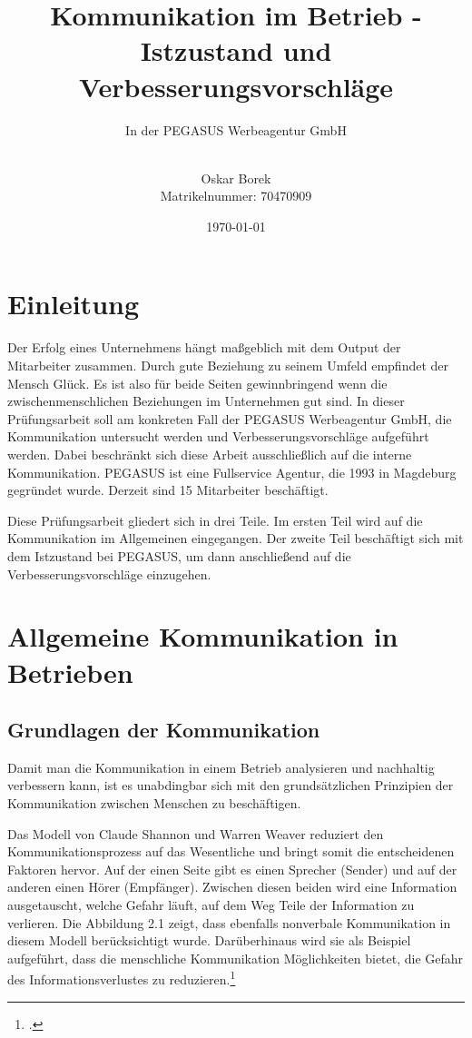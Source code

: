 \documentclass[12pt, DIV9, BCOR9mm, onecolumn, headsepline, ngerman]{scrreprt}
\title{Kommunikation im Betrieb - Istzustand und Verbesserungsvorschläge}
\subtitle{In der PEGASUS Werbeagentur GmbH}
\author{\\[1cm]Oskar Borek \\ Matrikelnummer: 70470909 }
\date{\today}
\begin{document}
 

\maketitle

\newpage
\tableofcontents

\newpage

\pagestyle{headings}


\chapter{Einleitung}

Der Erfolg eines Unternehmens hängt maßgeblich mit dem Output der Mitarbeiter zusammen. Durch gute Beziehung zu seinem Umfeld empfindet der Mensch Glück. Es ist also für beide Seiten gewinnbringend wenn die zwischenmenschlichen Beziehungen im Unternehmen gut sind. In dieser Prüfungsarbeit soll am konkreten Fall der PEGASUS Werbeagentur GmbH, die Kommunikation untersucht werden und Verbesserungsvorschläge aufgeführt werden. Dabei beschränkt sich diese Arbeit ausschließlich auf die interne Kommunikation.
PEGASUS ist eine Fullservice Agentur, die 1993 in Magdeburg gegründet wurde. Derzeit sind 15 Mitarbeiter beschäftigt.

Diese Prüfungsarbeit gliedert sich in drei Teile. Im ersten Teil wird auf die Kommunikation im Allgemeinen eingegangen. Der zweite Teil beschäftigt sich mit dem Istzustand bei PEGASUS, um dann anschließend auf die Verbesserungsvorschläge einzugehen.


\chapter{Allgemeine Kommunikation in Betrieben}
\section{Grundlagen der Kommunikation} 

Damit man die Kommunikation in einem Betrieb analysieren und nachhaltig verbessern kann, ist es unabdingbar sich mit den grundsätzlichen Prinzipien der Kommunikation zwischen Menschen zu beschäftigen.

Das Modell von Claude Shannon und Warren Weaver reduziert den Kommunikationsprozess auf das Wesentliche und bringt somit die entscheidenen Faktoren hervor. Auf der einen Seite gibt es einen Sprecher (Sender) und auf der anderen einen Hörer (Empfänger). Zwischen diesen beiden wird eine Information ausgetauscht, welche Gefahr läuft, auf dem Weg Teile der Information zu verlieren. Die Abbildung 2.1 zeigt, dass ebenfalls nonverbale Kommunikation in diesem Modell berücksichtigt wurde. Darüberhinaus wird sie als Beispiel aufgeführt, dass die menschliche Kommunikation Möglichkeiten bietet, die Gefahr des Informationsverlustes zu reduzieren.\footcite[vgl.][S.33f]{GehmKommunikation}
\end{document}

